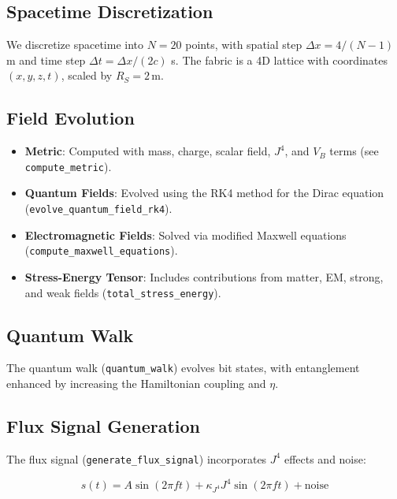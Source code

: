 \documentclass[12pt]{article}
\begin{document}
\subsection{Spacetime Discretization}

We discretize spacetime into \( N = 20 \) points, with spatial step \( \Delta x = 4 / (N-1) \) m and time step \( \Delta t = \Delta x / (2c) \) s. The fabric is a 4D lattice with coordinates \( (x, y, z, t) \), scaled by \( R_S = 2 \, \text{m} \).

\subsection{Field Evolution}

\begin{itemize}
    \item \textbf{Metric}: Computed with mass, charge, scalar field, \( J^4 \), and \( V_B \) terms (see \texttt{compute\_metric}).
    \item \textbf{Quantum Fields}: Evolved using the RK4 method for the Dirac equation (\texttt{evolve\_quantum\_field\_rk4}).
    \item \textbf{Electromagnetic Fields}: Solved via modified Maxwell equations (\texttt{compute\_maxwell\_equations}).
    \item \textbf{Stress-Energy Tensor}: Includes contributions from matter, EM, strong, and weak fields (\texttt{total\_stress\_energy}).
\end{itemize}

\subsection{Quantum Walk}

The quantum walk (\texttt{quantum\_walk}) evolves bit states, with entanglement enhanced by increasing the Hamiltonian coupling and \( \eta \).

\subsection{Flux Signal Generation}

The flux signal (\texttt{generate\_flux\_signal}) incorporates \( J^4 \) effects and noise:

\begin{equation}
s(t) = A \sin(2\pi f t) + \kappa_{J^4} J^4 \sin(2\pi f t) + \text{noise}
\label{eq:flux_signal}
\end{equation}
\end{document}
